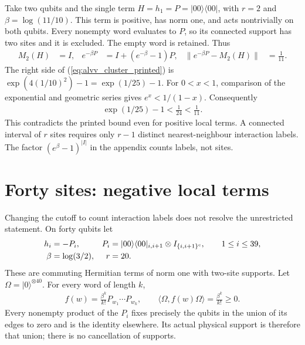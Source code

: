 \documentclass{article}
\begin{document}
Take two qubits and the single term
$H=h_1=P=|00\rangle\langle00|$, with
$r=2$ and $\beta=\log(11/10)$. This term is positive, has norm one,
and acts nontrivially on both qubits. Every nonempty word evaluates to $P$,
so its connected support has two sites and it is excluded. The empty word
is retained. Thus
\begin{align}
    M_2(H)                  & =I,                 &
    e^{-\beta P}            & =I+(e^{-\beta}-1)P, &
    \|e^{-\beta P}-M_2(H)\| & =\frac1{11}.
    \label{eq:alvv_cluster_two_sites}
\end{align}
The right side of (\ref{eq:alvv_cluster_printed}) is
$\exp(4(1/10)^2)-1=\exp(1/25)-1$. For $0<x<1$, comparison of the
exponential and geometric series gives $e^x<1/(1-x)$. Consequently
\begin{align}
    \exp(1/25)-1<\frac1{24}<\frac1{11}.
    \label{eq:alvv_cluster_two_sites_comparison}
\end{align}
This contradicts the printed bound even for positive local terms. A connected
interval of $r$ sites requires only $r-1$ distinct nearest-neighbour
interaction labels. The factor $(e^\beta-1)^{|I|}$ in the appendix counts
labels, not sites.

\section{Forty sites: negative local terms}

Changing the cutoff to count interaction labels does not resolve the
unrestricted statement. On forty qubits let
\begin{align}
    h_i   & =-P_i,                                                          &
    P_i   & =|00\rangle\langle00|_{i,i+1}\otimes I_{\{i,i+1\}^{\mathrm c}},
    \qquad 1\le i\le39,
    \label{eq:alvv_cluster_negative_terms}                                             \\
    \beta & =\log(3/2),                                                     & r & =20.
    \notag
\end{align}
These are commuting Hermitian terms of norm one with two-site
supports. Let $\Omega=|0\rangle^{\otimes40}$. For every word of length $k$,
\begin{align}
    f(w)=\frac{\beta^k}{k!}P_{w_1}\cdots P_{w_k},
    \qquad \langle\Omega,f(w)\Omega\rangle=\frac{\beta^k}{k!}\ge0.
    \label{eq:alvv_cluster_positive_coefficients}
\end{align}
Every nonempty product of the $P_i$ fixes precisely the qubits in the union
of its edges to zero and is the identity elsewhere. Its actual physical
support is therefore that union; there is no cancellation of supports.
\end{document}

